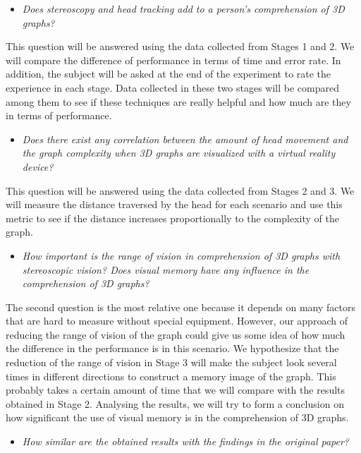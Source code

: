 \begin{itemize}
\tightlist
\item
  \emph{Does stereoscopy and head tracking add to a person's
  comprehension of 3D graphs?}
\end{itemize}

This question will be answered using the data collected from Stages 1
and 2. We will compare the difference of performance in terms of time
and error rate. In addition, the subject will be asked at the end of the
experiment to rate the experience in each stage. Data collected in these
two stages will be compared among them to see if these techniques are
really helpful and how much are they in terms of performance.

\begin{itemize}
\tightlist
\item
  \emph{Does there exist any correlation between the amount of head
  movement and the graph complexity when 3D graphs are visualized with a
  virtual reality device?}
\end{itemize}

This question will be answered using the data collected from Stages 2
and 3. We will measure the distance traversed by the head for each
scenario and use this metric to see if the distance increases
proportionally to the complexity of the graph.

\begin{itemize}
\tightlist
\item
  \emph{How important is the range of vision in comprehension of 3D
  graphs with stereoscopic vision? Does visual memory have any influence
  in the comprehension of 3D graphs?}
\end{itemize}

The second question is the most relative one because it depends on many
factors that are hard to measure without special equipment. However, our
approach of reducing the range of vision of the graph could give us some
idea of how much the difference in the performance is in this scenario.
We hypothesize that the reduction of the range of vision in Stage 3 will
make the subject look several times in different directions to construct
a memory image of the graph. This probably takes a certain amount of
time that we will compare with the results obtained in Stage 2.
Analysing the results, we will try to form a conclusion on how
significant the use of visual memory is in the comprehension of 3D
graphs.

\begin{itemize}
\tightlist
\item
  \emph{How similar are the obtained results with the findings in the
  original paper?}
\end{itemize}

